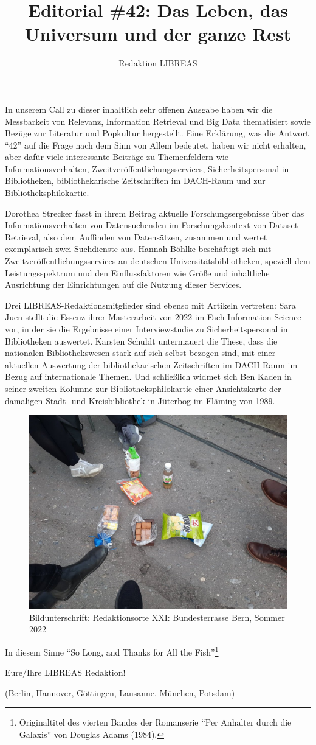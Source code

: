\documentclass[a4paper,
fontsize=11pt,
oneside,
numbers=noperiodatend,
parskip=half-,
bibliography=totoc,
final
]{scrartcl}
\title{\LARGE{Editorial \#42: Das Leben, das Universum und der ganze Rest}}%
\author{Redaktion LIBREAS} %
\date{}
\begin{document}
\maketitle
\thispagestyle{fancyplain} 


In unserem Call zu dieser inhaltlich sehr offenen Ausgabe haben wir die
Messbarkeit von Relevanz, Information Retrieval und Big Data
thematisiert sowie Bezüge zur Literatur und Popkultur hergestellt. Eine
Erklärung, was die Antwort \enquote{42} auf die Frage nach dem Sinn von
Allem bedeutet, haben wir nicht erhalten, aber dafür viele interessante
Beiträge zu Themenfeldern wie Informationsverhalten,
Zweitveröffentlichungsservices, Sicherheitspersonal in Bibliotheken,
bibliothekarische Zeitschriften im DACH-Raum und zur
Bibliotheksphilokartie.

Dorothea Strecker fasst in ihrem Beitrag aktuelle Forschungsergebnisse
über das Informationsverhalten von Datensuchenden im Forschungskontext
von Dataset Retrieval, also dem Auffinden von Datensätzen, zusammen und
wertet exemplarisch zwei Suchdienste aus. Hannah Böhlke beschäftigt sich
mit Zweitveröffentlichungsservices an deutschen
Universitätsbibliotheken, speziell dem Leistungsspektrum und den
Einflussfaktoren wie Größe und inhaltliche Ausrichtung der Einrichtungen
auf die Nutzung dieser Services.

Drei LIBREAS-Redaktionsmitglieder sind ebenso mit Artikeln vertreten:
Sara Juen stellt die Essenz ihrer Masterarbeit von 2022 im Fach
Information Science vor, in der sie die Ergebnisse einer Interviewstudie
zu Sicherheitspersonal in Bibliotheken auswertet. Karsten Schuldt
untermauert die These, dass die nationalen Bibliothekswesen stark auf
sich selbst bezogen sind, mit einer aktuellen Auswertung der
bibliothekarischen Zeitschriften im DACH-Raum im Bezug auf
internationale Themen. Und schließlich widmet sich Ben Kaden in seiner
zweiten Kolumne zur Bibliotheksphilokartie einer Ansichtskarte der
damaligen Stadt- und Kreisbibliothek in Jüterbog im Fläming von 1989.

\begin{figure}[t!]
\centering
\includegraphics[width=.6\textwidth]{img/bern-snacks-feet.jpeg}
\caption{Bildunterschrift: Redaktionsorte XXI: Bundesterrasse Bern, Sommer 2022}
\end{figure}

In diesem Sinne \enquote{So Long, and Thanks for All the
Fish}\footnote{Originaltitel des vierten Bandes der Romanserie
  \enquote{Per Anhalter durch die Galaxis} von Douglas Adams (1984).}

Eure/Ihre LIBREAS Redaktion!

(Berlin, Hannover, Göttingen, Lausanne, München, Potsdam)

\end{document}
